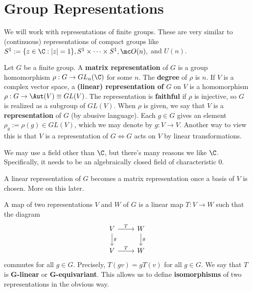 
\section{Group Representations}

We will work with representations of finite groups. These are very similar to (continuous) representations of compact groups like $S^1:= \{ z \in \C : |z|=1\},S^1\times \cdots\times S^1,\mc O(n),$ and $U(n)$.

\begin{defn}
    Let $G$ be a finite group. A \textbf{matrix representation} of $G$ is a group homomorphism $\rho : G \to GL_n(\C)$ for some $n$. The \textbf{degree} of $\rho$ is $n$. If $V$ is a complex vector space, a \textbf{(linear) representation of} $G$ on $V$ is a homomorphism $\rho :G \to \Aut (V)\equiv GL(V)$. The representation is \textbf{faithful} if $\rho$ is injective, so $G$ is realized as a subgroup of $GL(V)$. When $\rho$ is given, we say that $V$ is a \textbf{representation} of $G$ (by abusive language). Each $g \in G$ gives an element $\rho_g:=\rho(g) \in GL(V)$, which we may denote by $g:V\to V$. Another way to view this is that $V$ is a representation of $G \iff G$ acts on $V$ by linear transformations.
\end{defn}

We may use a field other than $\C$, but there's many reasons we like $\C$. Specifically, it needs to be an algebraically closed field of characteristic 0.

\begin{rmk}
    A linear representation of $G$ becomes a matrix representation once a basis of $V$ is chosen. More on this later.
\end{rmk}

\begin{defn}
    A map of two representations $V$ and $W$ of $G$ is a linear map $T:V \to W$ such that the diagram
    \[\begin{tikzcd}[ampersand replacement=\&,sep=small]
    	V \&\& W \\
    	\\
    	V \&\& W
    	\arrow["T", from=1-1, to=1-3]
    	\arrow["g", from=1-1, to=3-1]
    	\arrow["g", from=1-3, to=3-3]
    	\arrow["T", from=3-1, to=3-3]
    \end{tikzcd}\]
    commutes for all $g \in G$. Precisely, $T(gv)=gT(v)$ for all $g \in G$. We say that $T$ is \textbf{$\bm G$-linear} or \textbf{$\bm G$-equivariant}. This allows us to define \textbf{isomorphisms} of two representations in the obvious way.
\end{defn}

